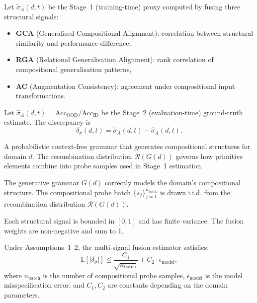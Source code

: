 
\begin{definition}
Let $\tilde{\sigma}_A(d,t)$ be the Stage~1 (training-time) proxy computed
by fusing three structural signals:
\begin{itemize}[nosep]
\item \textbf{GCA} (Generalised Compositional Alignment): correlation
  between structural similarity and performance difference,
\item \textbf{RGA} (Relational Generalisation Alignment): rank correlation
  of compositional generalisation patterns,
\item \textbf{AC} (Augmentation Consistency): agreement under compositional
  input transformations.
\end{itemize}
Let $\hat{\sigma}_A(d,t) = \text{Acc}_{\text{OOD}} / \text{Acc}_{\text{ID}}$
be the Stage~2 (evaluation-time) ground-truth estimate. The discrepancy is
\[
\delta_\sigma(d,t) = \tilde{\sigma}_A(d,t) - \hat{\sigma}_A(d,t).
\]
\end{definition}

\begin{definition}
A probabilistic context-free grammar that generates compositional structures
for domain $d$. The recombination distribution $\mathcal{R}(G(d))$ governs
how primitive elements combine into probe samples used in Stage~1 estimation.
\end{definition}

\begin{assumption}
The generative grammar $G(d)$ correctly models the domain's compositional
structure. The compositional probe batch $\{s_j\}_{j=1}^{n_{\text{batch}}}$
is drawn i.i.d. from the recombination distribution $\mathcal{R}(G(d))$.
\end{assumption}

\begin{assumption}
Each structural signal is bounded in $[0,1]$ and has finite variance.
The fusion weights are non-negative and sum to 1.
\end{assumption}

\begin{proposition}
\label{prop:estimator}
Under Assumptions~1--2, the multi-signal fusion estimator satisfies:
\[
\mathbb{E}[|\delta_\sigma|] \leq
\frac{C_1}{\sqrt{n_{\text{batch}}}} + C_2 \cdot \epsilon_{\text{model}},
\]
where $n_{\text{batch}}$ is the number of compositional probe samples,
$\epsilon_{\text{model}}$ is the model misspecification error, and
$C_1, C_2$ are constants depending on the domain parameters.
\end{proposition}

